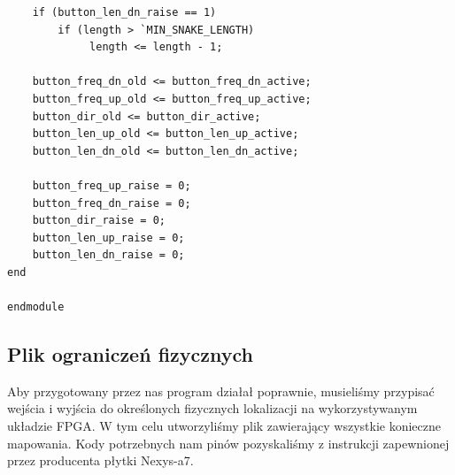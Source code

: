 \documentclass[a4paper]{article}
\begin{document}
\begin{verbatim}
    if (button_len_dn_raise == 1)
        if (length > `MIN_SNAKE_LENGTH) 
             length <= length - 1;
        
    button_freq_dn_old <= button_freq_dn_active;
    button_freq_up_old <= button_freq_up_active;
    button_dir_old <= button_dir_active;
    button_len_up_old <= button_len_up_active;
    button_len_dn_old <= button_len_dn_active;
        
    button_freq_up_raise = 0;
    button_freq_dn_raise = 0;
    button_dir_raise = 0;
    button_len_up_raise = 0;
    button_len_dn_raise = 0;
end

endmodule
\end{verbatim}

\pagebreak
\subsection{Plik ograniczeń fizycznych}

Aby przygotowany przez nas program działał poprawnie, musieliśmy przypisać wejścia
i wyjścia do określonych fizycznych lokalizacji na wykorzystywanym układzie FPGA.
W tym celu utworzyliśmy plik zawierający wszystkie konieczne mapowania.
Kody potrzebnych nam pinów pozyskaliśmy z instrukcji zapewnionej przez producenta 
płytki Nexys-a7.
\end{document}

